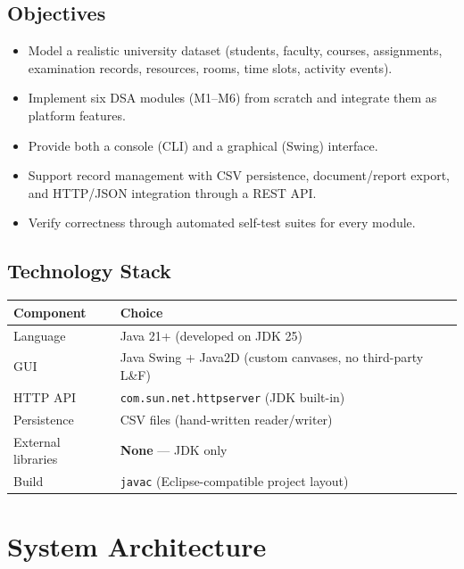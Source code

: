 \documentclass[11pt,a4paper]{article}
\begin{document}
\subsection{Objectives}
\begin{itemize}
    \item Model a realistic university dataset (students, faculty, courses, assignments,
    examination records, resources, rooms, time slots, activity events).
    \item Implement six DSA modules (M1--M6) from scratch and integrate them as platform
    features.
    \item Provide both a console (CLI) and a graphical (Swing) interface.
    \item Support record management with CSV persistence, document/report export, and
    HTTP/JSON integration through a REST API.
    \item Verify correctness through automated self-test suites for every module.
\end{itemize}

\subsection{Technology Stack}
\begin{center}
\begin{tabular}{ll}
\toprule
Component & Choice \\
\midrule
Language & Java 21+ (developed on JDK 25) \\
GUI & Java Swing + Java2D (custom canvases, no third-party L\&F) \\
HTTP API & \texttt{com.sun.net.httpserver} (JDK built-in) \\
Persistence & CSV files (hand-written reader/writer) \\
External libraries & \textbf{None} --- JDK only \\
Build & \texttt{javac} (Eclipse-compatible project layout) \\
\bottomrule
\end{tabular}
\end{center}

\section{System Architecture}
\end{document}

